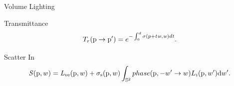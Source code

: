 \documentclass[10pt,compress,professionalfont]{beamer}
\begin{document}
\begin{frame}{Volume Lighting}

    \begin{block}{Transmittance}
        \[
            T_{r}(\textup{p} \to \textup{p}') = e^{-\int_{0}^{d}\sigma (p+t\mathit{w},\mathit{w})d\mathit{t}}.
        \]
    \end{block}

    \begin{block}{Scatter In}
        \[
            \mathit{S}(\textup{p},w) = \mathit{L}_{\textup{ve}}(\textup{p},w) + \sigma_{\textup{s}}(\textup{p}, w) \int_{\mathbb{S}^2} phase(\textup{p}, -w' \to w) L_{i}(\textup{p},w')\textup{d}w'.
        \]
    \end{block}

\end{frame}
\end{document}

